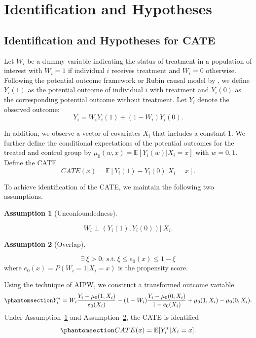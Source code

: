 \documentclass[
  12pt,
  12pt]{article}
\numberwithin{equation}{section}
\theoremstyle{definition}
\newtheorem{exercise}{Assumption}[section]
\theoremstyle{plain}
\theoremstyle{plain}
\theoremstyle{remark}
\begin{document}
\section{Identification and Hypotheses}\label{sec-id-hypo}

\subsection{Identification and Hypotheses for CATE}\label{sec-cate}

Let \(W_i\) be a dummy variable indicating the status of treatment in a
population of interest with \(W_i = 1\) if individual \(i\) receives
treatment and \(W_i = 0\) otherwise. Following the potential outcome
framework or Rubin causal model by \citet{rubin1974estimating}, we
define \(Y_i(1)\) as the potential outcome of individual \(i\) with
treatment and \(Y_i(0)\) as the corresponding potential outcome without
treatment. Let \(Y_i\) denote the observed outcome: \[
Y_i = W_iY_i(1) + (1 - W_i)Y_i(0).
\]

In addition, we observe a vector of covariates \(X_i\) that includes a
constant \(1\). We further define the conditional expectations of the
potential outcomes for the treated and control group by
\(\mu_0(w, x) = \mathbb{E}[Y_i(w)|X_i = x]\) with \(w = 0, 1\). Define
the CATE \[
CATE(x) = \mathbb{E}[Y_i(1) - Y_i(0)|X_i = x].
\]

To achieve identification of the CATE, we maintain the following two
assumptions.

\begin{exercise}[Unconfoundedness]\protect\hypertarget{exr-unconfound}{}\label{exr-unconfound}

\[
W_i \perp (Y_i(1), Y_i(0)) \vert \ X_i.
\]

\end{exercise}

\begin{exercise}[Overlap]\protect\hypertarget{exr-overlap}{}\label{exr-overlap}

\[
\exists \ \xi > 0, \ \text{s.t.} \ \xi \leqslant e_0(x) \leqslant 1 - \xi
\] where \(e_0(x) = P(W_i = 1|X_i = x)\) is the propensity score.

\end{exercise}

Using the technique of AIPW, we construct a transformed outcome variable
\begin{equation}\phantomsection\label{eq-tot}{
Y^*_i = W_i\frac{Y_i - \mu_0(1, X_i)}{e_0(X_i)} - (1 - W_i)\frac{Y_i - \mu_0(0, X_i)}{1 - e_0(X_i)} + \mu_0(1, X_i) - \mu_0(0, X_i).
}\end{equation} Under Assumption~\ref{exr-unconfound} and
Assumption~\ref{exr-overlap}, the CATE is identified
\begin{equation}\phantomsection\label{eq-cate}{
CATE(x) = \mathbb{E}[Y^*_i|X_i = x].
}\end{equation}
\end{document}

